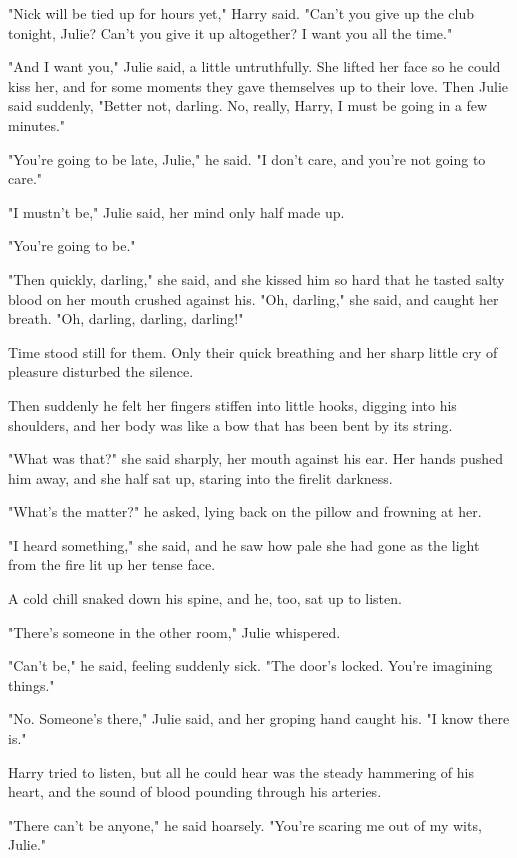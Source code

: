 \documentclass{novel}
\begin{document}
"Nick will be tied up for hours yet," Harry said. "Can't you give up the club tonight, Julie? Can't you give it up altogether? I want you all the time."

"And I want you," Julie said, a little untruthfully. She lifted her face so he could kiss her, and for some moments they gave themselves up to their love. Then Julie said suddenly, "Better not, darling. No, really, Harry, I must be going in a few minutes."

"You're going to be late, Julie," he said. "I don't care, and you're not going to care."

"I mustn't be," Julie said, her mind only half made up.

"You're going to be."

"Then quickly, darling," she said, and she kissed him so hard that he tasted salty blood on her mouth crushed against his. "Oh, darling," she said, and caught her breath. "Oh, darling, darling, darling!"

Time stood still for them. Only their quick breathing and her sharp little cry of pleasure disturbed the silence.

Then suddenly he felt her fingers stiffen into little hooks, digging into his shoulders, and her body was like a bow that has been bent by its string.

"What was that?" she said sharply, her mouth against his ear. Her hands pushed him away, and she half sat up, staring into the firelit darkness.

"What's the matter?" he asked, lying back on the pillow and frowning at her.

"I heard something," she said, and he saw how pale she had gone as the light from the fire lit up her tense face.

A cold chill snaked down his spine, and he, too, sat up to listen.

"There's someone in the other room," Julie whispered.

"Can't be," he said, feeling suddenly sick. "The door's locked. You're imagining things."

"No. Someone's there," Julie said, and her groping hand caught his. "I know there is."

Harry tried to listen, but all he could hear was the steady hammering of his heart, and the sound of blood pounding through his arteries.

"There can't be anyone," he said hoarsely. "You're scaring me out of my wits, Julie."
\end{document}

